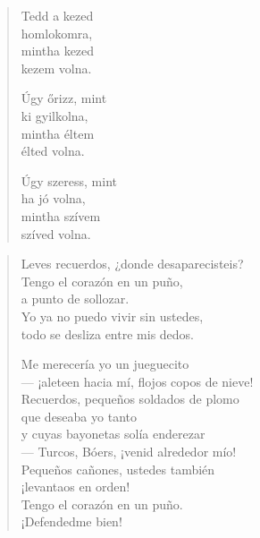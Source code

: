 \documentclass[11pt]{book}
\newcommand*{\centeredornament}{\centerline{\pgfornament[width=6cm]{88}}}
\begin{document}


\begin{verse}
  Tedd a kezed \\
  homlokomra, \\
  mintha kezed \\
  kezem volna.

  Úgy őrizz, mint \\
  ki gyilkolna, \\
  mintha éltem \\
  élted volna.

  Úgy szeress, mint \\
  ha jó volna, \\
  mintha szívem \\
  szíved volna.
\end{verse}

\newpage

\vspace*{-15mm}
\centeredornament




\begin{verse}
  Leves recuerdos, ¿donde desaparecisteis? \\
  Tengo el corazón en un puño, \\
  a punto de sollozar. \\
  Yo ya no puedo vivir sin ustedes, \\
  todo se desliza entre mis dedos.

  Me merecería yo un jueguecito \\
  --- ¡aleteen hacia mí, flojos copos de nieve! \\
  Recuerdos, pequeños soldados de plomo \\
  que deseaba yo tanto \\
  y cuyas bayonetas solía enderezar \\
  --- Turcos, Bóers, ¡venid alrededor mío! \\
  Pequeños cañones, ustedes también \\
  ¡levantaos en orden! \\
  Tengo el corazón en un puño. \\
  ¡Defendedme bien!
\end{verse}
\end{document}
